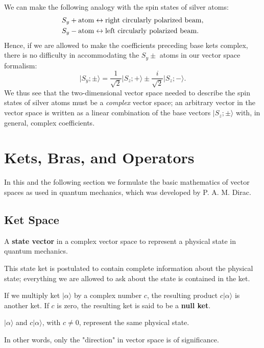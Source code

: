 \documentclass[11pt]{elegantbook}
\begin{document}
We can make the following analogy with the spin states of silver atoms:
\begin{align}
  S_y+\rm{atom}&\leftrightarrow \rm{right\ circularly\ polarized\ beam},\\
  S_y-\rm{atom}&\leftrightarrow \rm{left\ circularly\ polarized\ beam}.
\end{align}
Hence, if we are allowed to make the coefficients preceding base kets complex, there is 
no difficulty in accommodating the $S_y\pm$ atoms in our vector space formalism:
\begin{equation}
  \vert S_y;\pm\rangle=\frac{1}{\sqrt{2}}\vert S_z;+\rangle\pm\frac{i}{\sqrt{2}}\vert S_z;-\rangle.
\end{equation}
We thus see that the two-dimensional vector space needed to describe the spin states of 
silver atoms must be a \textit{complex} vector space; an arbitrary vector in the vector 
space is written as a linear combination of the base vectors $\vert S_z;\pm\rangle$ with, 
in general, complex coefficients.

\newpage

\section{Kets, Bras, and Operators}

In this and the following section we formulate the basic mathematics of vector spaces 
as used in quantum mechanics, which was developed by P. A. M. Dirac.

\subsection{Ket Space}

\begin{definition}[Ket]
  A \textbf{state vector} in a complex vector space to represent a physical state in quantum mechanics.
\end{definition}
This state ket is postulated to contain complete information about the physical state; 
everything we are allowed to ask about the state is contained in the ket.

If we multiply ket $\vert\alpha\rangle$ by a complex number $c$, the resulting product 
$c\vert\alpha\rangle$ is another ket. If $c$ is zero, the resulting ket is said to be a 
\textbf{null ket}.

\begin{postulate}
$\vert\alpha\rangle$ and $c\vert\alpha\rangle$, with $c\neq 0$, represent the same physical state.
\end{postulate}
In other words, only the "direction" in vector space is of significance.
\end{document}
